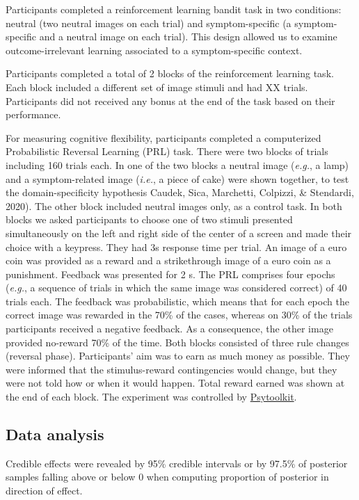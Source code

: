 \documentclass[
  man,floatsintext]{apa6}
\begin{document}
Participants completed a reinforcement learning bandit task in two conditions: neutral (two neutral images on each trial) and symptom-specific (a symptom-specific and a neutral image on each trial). This design allowed us to examine outcome-irrelevant learning associated to a symptom-specific context.

Participants completed a total of 2 blocks of the reinforcement learning task. Each block included a different set of image stimuli and had XX trials. Participants did not received any bonus at the end of the task based on their performance.

For measuring cognitive flexibility, participants completed a computerized Probabilistic Reversal Learning (PRL) task.
There were two blocks of trials including 160 trials each. In one of the two blocks a neutral image (\emph{e.g.}, a lamp) and a symptom-related image (\emph{i.e.}, a piece of cake) were shown together, to test the domain-specificity hypothesis Caudek, Sica, Marchetti, Colpizzi, \& Stendardi, 2020). The other block included neutral images only, as a control task.
In both blocks we asked participants to choose one of two stimuli presented simultaneously on the left and right side of the center of a screen and made their choice with a keypress. They had 3s response time per trial. An image of a euro coin was provided as a reward and a strikethrough image of a euro coin as a punishment. Feedback was presented for 2 s.
The PRL comprises four epochs (\emph{e.g.}, a sequence of trials in which the same image was considered correct) of 40 trials each.
The feedback was probabilistic, which means that for each epoch the correct image was rewarded in the 70\% of the cases, whereas on 30\% of the trials participants received a negative feedback.
As a consequence, the other image provided no-reward 70\% of the time. Both blocks consisted of three rule changes (reversal phase).
Participants' aim was to earn as much money as possible. They were informed that the stimulus-reward contingencies would change, but they were not told how or when it would happen.
Total reward earned was shown at the end of each block.
The experiment was controlled by \href{https://www.psytoolkit.org/}{Psytoolkit}.

\hypertarget{data-analysis}{%
\subsection{Data analysis}\label{data-analysis}}

Credible effects were revealed by 95\% credible intervals or by 97.5\% of posterior samples falling above or below 0 when computing proportion of posterior in direction of effect.
\end{document}
